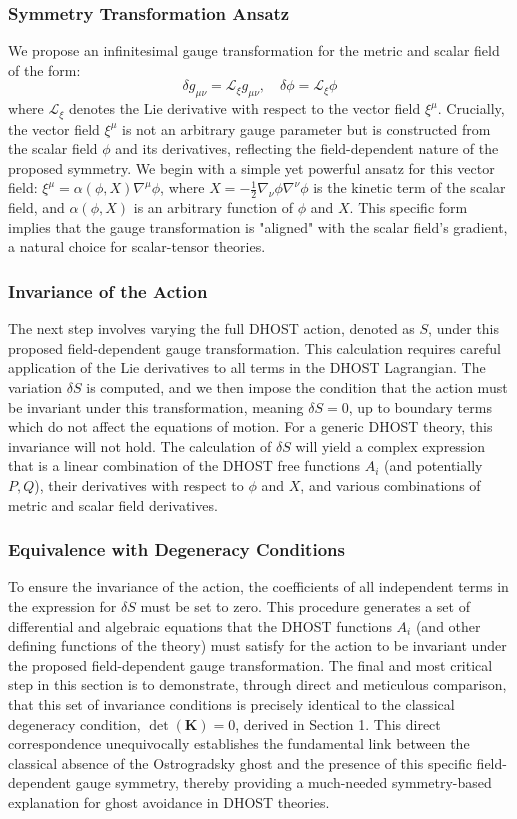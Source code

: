 \documentclass[twocolumn]{aastex631}
\begin{document}
\subsubsection{Symmetry Transformation Ansatz}
We propose an infinitesimal gauge transformation for the metric and scalar field of the form:
$$
\delta g_{\mu\nu} = \mathcal{L}_{\xi} g_{\mu\nu}, \quad \delta\phi = \mathcal{L}_{\xi} \phi
$$
where $\mathcal{L}_{\xi}$ denotes the Lie derivative with respect to the vector field $\xi^{\mu}$. Crucially, the vector field $\xi^{\mu}$ is not an arbitrary gauge parameter but is constructed from the scalar field $\phi$ and its derivatives, reflecting the field-dependent nature of the proposed symmetry. We begin with a simple yet powerful ansatz for this vector field: $\xi^\mu = \alpha(\phi, X) \nabla^\mu \phi$, where $X = -\frac{1}{2}\nabla_\nu \phi \nabla^\nu \phi$ is the kinetic term of the scalar field, and $\alpha(\phi, X)$ is an arbitrary function of $\phi$ and $X$. This specific form implies that the gauge transformation is "aligned" with the scalar field's gradient, a natural choice for scalar-tensor theories.

\subsubsection{Invariance of the Action}
The next step involves varying the full DHOST action, denoted as $S$, under this proposed field-dependent gauge transformation. This calculation requires careful application of the Lie derivatives to all terms in the DHOST Lagrangian. The variation $\delta S$ is computed, and we then impose the condition that the action must be invariant under this transformation, meaning $\delta S = 0$, up to boundary terms which do not affect the equations of motion. For a generic DHOST theory, this invariance will not hold. The calculation of $\delta S$ will yield a complex expression that is a linear combination of the DHOST free functions $A_i$ (and potentially $P, Q$), their derivatives with respect to $\phi$ and $X$, and various combinations of metric and scalar field derivatives.

\subsubsection{Equivalence with Degeneracy Conditions}
To ensure the invariance of the action, the coefficients of all independent terms in the expression for $\delta S$ must be set to zero. This procedure generates a set of differential and algebraic equations that the DHOST functions $A_i$ (and other defining functions of the theory) must satisfy for the action to be invariant under the proposed field-dependent gauge transformation. The final and most critical step in this section is to demonstrate, through direct and meticulous comparison, that this set of invariance conditions is precisely identical to the classical degeneracy condition, $\det(\mathbf{K})=0$, derived in Section 1. This direct correspondence unequivocally establishes the fundamental link between the classical absence of the Ostrogradsky ghost and the presence of this specific field-dependent gauge symmetry, thereby providing a much-needed symmetry-based explanation for ghost avoidance in DHOST theories.
\end{document}
